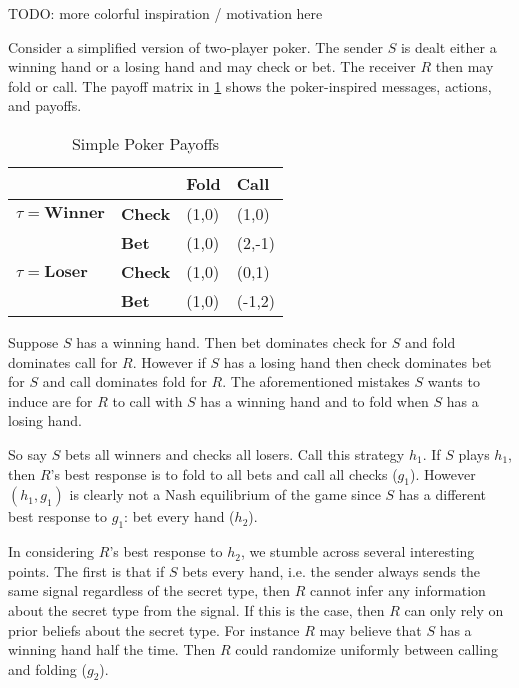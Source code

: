 \documentclass{article}
\begin{document}
TODO: more colorful inspiration / motivation here

Consider a simplified version of two-player poker. The sender $S$ is dealt either a winning hand or a losing hand and may check or bet. The receiver $R$ then may fold or call. The payoff matrix in \ref{simplepokerpayoffs} shows the poker-inspired messages, actions, and payoffs.

\begin{table}[H]
	\centering
	\caption{Simple Poker Payoffs}
	\label{simplepokerpayoffs}
	\begin{tabular}{ll|l|l|}
		\cline{3-4}
		&       & \textbf{Fold} & \textbf{Call} \\ \hline
		\multicolumn{1}{|l|}{$\tau=\textbf{Winner}$} & \textbf{Check} & (1,0)  & (1,0)  \\ \cline{2-4}
		\multicolumn{1}{|l|}{}        & \textbf{Bet}   & (1,0)  & (2,-1)  \\ \hline
		\multicolumn{1}{|l|}{$\tau=\textbf{Loser}$}  & \textbf{Check} & (1,0)  & (0,1)  \\ \cline{2-4}
		\multicolumn{1}{|l|}{}        & \textbf{Bet}   & (1,0)  & (-1,2) \\ \hline
	\end{tabular}
\end{table}

Suppose $S$ has a winning hand. Then bet dominates check for $S$ and fold dominates call for $R$. However if $S$ has a losing hand then check dominates bet for $S$ and call dominates fold for $R$. The aforementioned mistakes $S$ wants to induce are for $R$ to call with $S$ has a winning hand and to fold when $S$ has a losing hand.

So say $S$ bets all winners and checks all losers. Call this strategy $h_1$. If $S$ plays $h_1$, then $R$'s best response is to fold to all bets and call all checks ($g_1$). However $(h_1, g_1)$ is clearly not a Nash equilibrium of the game since $S$ has a different best response to $g_1$: bet every hand ($h_2$).

In considering $R$'s best response to $h_2$, we stumble across several interesting points. The first is that if $S$ bets every hand, i.e. the sender always sends the same signal regardless of the secret type, then $R$ cannot infer any information about the secret type from the signal. If this is the case, then $R$ can only rely on prior beliefs about the secret type. For instance $R$ may believe that $S$ has a winning hand half the time. Then $R$ could randomize uniformly between calling and folding ($g_2$).
\end{document}

